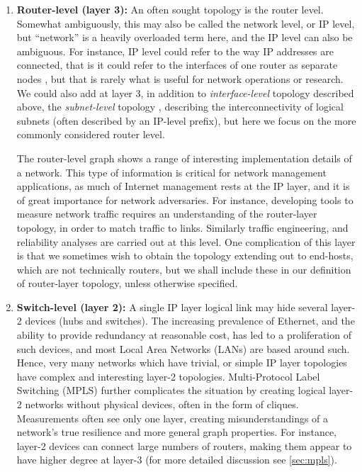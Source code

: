 \begin{enumerate}

\item {\bf Router-level (layer 3):} An often sought topology is the
  router level. Somewhat ambiguously, this may also be called the
  network level, or IP level, but ``network'' is a heavily overloaded
  term here, and the IP level can also be ambiguous. For instance, IP
  level could refer to the way IP addresses are connected, that is it
  could refer to the interfaces of one router as separate nodes
  \cite{broido01:_inter}, but that is rarely what is useful for
  network operations or research. We could also add at layer 3, in
  addition to {\em interface-level} topology described above, the {\em
    subnet-level} topology
  \cite{kardes12:_cheleb,gunes09:_resol_ip_inter,Tozal:2012:ENL:2342042.2342069,Tozal:tracenet:imc2010,broido01:_inter},
  describing the interconnectivity of logical subnets (often described
  by an IP-level prefix), but here we focus on the more commonly
  considered router level.

  The router-level graph shows a range of interesting implementation
  details of a network. This type of information is critical for
  network management applications, as much of Internet management
  rests at the IP layer, and it is of great importance for network
  adversaries. For instance, developing tools to measure network
  traffic requires an understanding of the router-layer topology, in
  order to match traffic to links. Similarly traffic engineering, and
  reliability analyses are carried out at this level. One complication
  of this layer is that we sometimes wish to obtain the topology
  extending out to end-hosts, which are not technically routers, but
  we shall include these in our definition of router-layer topology,
  unless otherwise specified.

\item {\bf Switch-level (layer 2):} A single IP layer logical link may
  hide several layer-2 devices (hubs and switches). The increasing
  prevalence of Ethernet, and the ability to provide redundancy at
  reasonable cost, has led to a proliferation of such devices, and
  most Local Area Networks (LANs) are based around such. Hence, very
  many networks which have trivial, or simple IP layer topologies have
  complex and interesting layer-2 topologies. Multi-Protocol Label
  Switching (MPLS) further complicates the situation by creating
  logical layer-2 networks without physical devices, often in the form
  of cliques. Measurements often see only one layer, creating
  misunderstandings of a network's true resilience and more general
  graph properties. For instance, layer-2 devices can connect large
  numbers of routers, making them appear to have higher degree at
  layer-3 \cite{Merindol:layer2:imc2010} (for more detailed discussion
  see \autoref{sec:mpls}).


\end{enumerate}
